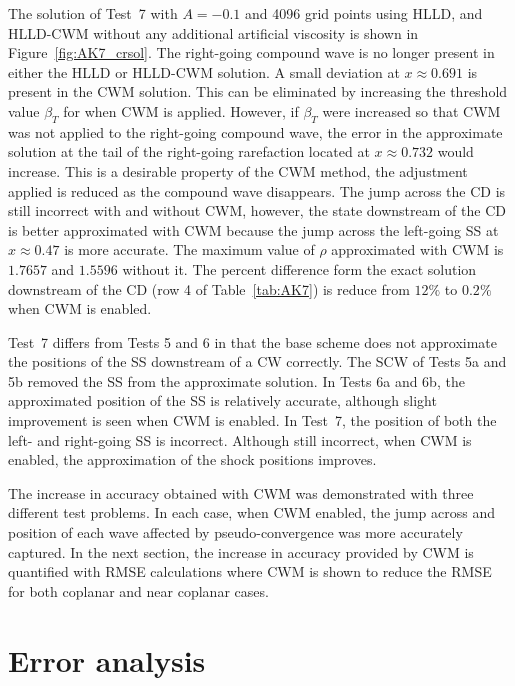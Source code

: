 The solution of Test~7 with $A = -0.1$ and 4096 grid points using HLLD, and HLLD-CWM without any additional artificial viscosity is shown in Figure~\ref{fig:AK7_crsol}.  The right-going compound wave is no longer present in either the HLLD or HLLD-CWM solution.  A small deviation at $x\approx 0.691$ is present in the CWM solution.  This can be eliminated by increasing the threshold value $\beta_T$ for when CWM is applied.  However, if $\beta_T$ were increased so that CWM was not applied to the right-going compound wave, the error in the approximate solution at the tail of the right-going rarefaction located at $x \approx 0.732$ would increase.  This is a desirable property of the CWM method, the adjustment applied is reduced as the compound wave disappears.  The jump across the CD is still incorrect with and without CWM, however, the state downstream of the CD is better approximated with CWM because the jump across the left-going SS at $x\approx 0.47$ is more accurate.  The maximum value of $\rho$ approximated with CWM is $1.7657$ and $1.5596$ without it.  The percent difference form the exact solution downstream of the CD (row 4 of Table~\ref{tab:AK7}) is reduce from $12\%$ to $0.2\%$ when CWM is enabled.

Test~7 differs from Tests 5 and 6 in that the base scheme does not approximate the positions of the SS downstream of a CW correctly.  The SCW of Tests 5a and 5b removed the SS from the approximate solution.  In Tests 6a and 6b, the approximated position of the SS is relatively accurate, although slight improvement is seen when CWM is enabled.  In Test~7, the position of both the left- and right-going SS is incorrect.  Although still incorrect, when CWM is enabled, the approximation of the shock positions improves.  

The increase in accuracy obtained with CWM was demonstrated with three different test problems.  In each case, when CWM enabled, the jump across and position of each wave affected by pseudo-convergence was more accurately captured.  In the next section, the increase in accuracy provided by CWM is quantified with RMSE calculations where CWM is shown to reduce the RMSE for both coplanar and near coplanar cases.

\section[Error analysis]{Error analysis}
\label{sec:error}

